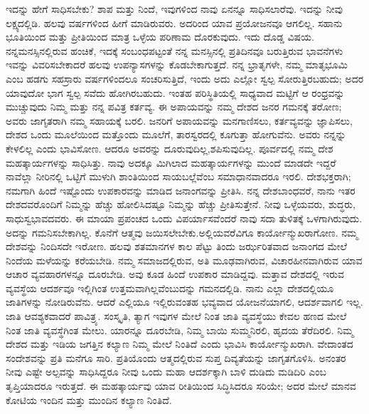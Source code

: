 \vskip 0.2cm

ಇದನ್ನು ಹೇಗೆ ಸಾಧಿಸಬೇಕು? ಶಾಪ ಮತ್ತು ನಿಂದೆ, ಇವುಗಳಿಂದ ನಾವು ಏನನ್ನೂ ಸಾಧಿಸಲಾರೆವು. ಇದನ್ನು ನೀವು ಲಕ್ಷ್ಯದಲ್ಲಿಡಿ. ಹಲವು ವರ್ಷಗಳಿಂದ ಹೀಗೆ ಮಾಡಿರುವರು. ಅದರಿಂದ ಯಾವ ಪ್ರಯೋಜನವೂ ಆಗಲಿಲ್ಲ. ಸಹಾನು ಭೂತಿಯಿಂದ ಮತ್ತು ಪ್ರೀತಿಯಿಂದ ಮಾತ್ರ ಒಳ್ಳೆಯ ಪರಿಣಾಮ ದೊರಕುವುದು. ಇದು ದೊಡ್ಡ ವಿಷಯ. ನನ್ನ\break ಮನಸ್ಸಿನಲ್ಲಿರುವ ಹಂಚಿಕೆ, ಇದಕ್ಕೆ ಸಂಬಂಧಪಟ್ಟಂತೆ ನನ್ನ ಮನಸ್ಸಿನಲ್ಲಿ ಪ್ರತಿದಿನವೂ ಬರು\-ತ್ತಿರುವ ಭಾವನೆಗಳು ಇವನ್ನು ವಿವರಿಸಬೇಕಾದರೆ ಹಲವು ಉಪನ್ಯಾಸಗಳನ್ನು ಕೊಡಬೇಕಾಗುತ್ತದೆ. ನನ್ನ ಭ್ರಾತೃಗಳೇ, ನಮ್ಮ ಮಾತೃಭೂಮಿ ಎಂಬ ಹಡಗು ಸಹಸ್ರಾರು ವರ್ಷಗಳಿಂದಲೂ ಸಂಚರಿಸುತ್ತಿದೆ, ಇಂದು ಅದು ಎಲ್ಲೋ ಸ್ವಲ್ಪ ಸೋರುತ್ತಿರಬಹುದು; ಅದರ ಯಾವುದೋ ಭಾಗ ಸ್ವಲ್ಪ ಸವೆದು ಹೋಗಿರಬಹುದು. ಇಂತಹ ಪರಿಸ್ಥಿತಿಯಲ್ಲಿ ಸಾಧ್ಯವಾದ ಮಟ್ಟಿಗೆ ಆ ರಂಧ್ರವನ್ನು ಮುಚ್ಚುವುದು ನಿಮ್ಮ ಮತ್ತು ನನ್ನ ಪವಿತ್ರ ಕರ್ತವ್ಯ. ಈ ಅಪಾಯವನ್ನು ನಮ್ಮ ದೇಶದ ಜನರ ಗಮನಕ್ಕೆ ತರೋಣ; ಅವರು ಜಾಗೃತರಾಗಿ ನಮ್ಮ ಸಹಾಯಕ್ಕೆ ಬರಲಿ. ಜನರಿಗೆ ಅಪಾಯವನ್ನು ಮನಗಾಣಿಸಲು, ಕರ್ತವ್ಯವನ್ನು ಜ್ಞಾಪಿಸಲು, ದೇಶದ ಒಂದು ಮೂಲೆಯಿಂದ ಮತ್ತೊಂದು ಮೂಲೆಗೆ, ತಾರಸ್ವರದಲ್ಲಿ ಕೂಗುತ್ತಾ ಹೋಗುವೆನು. ಅವರು ನನ್ನನ್ನು ಕೇಳಲಿಲ್ಲ ಎಂದು ಭಾವಿಸೋಣ. ಆದರೂ ಅವರನ್ನು ದೂರುವುದಿಲ್ಲ,\break ಶಪಿಸುವುದಿಲ್ಲ. ಪೂರ್ವದಲ್ಲಿ ನಮ್ಮ ದೇಶ ಮಹತ್ಕಾರ್ಯಗಳನ್ನು ಸಾಧಿಸಿತ್ತು. ನಾವು ಅದಕ್ಕೂ ಮಿಗಿಲಾದ ಮಹತ್ಕಾರ್ಯಗಳನ್ನು ಮುಂದೆ ಮಾಡದೇ ಇದ್ದರೆ ನಾವೆಲ್ಲಾ ನೀರಿನಲ್ಲಿ ಒಟ್ಟಿಗೆ ಮುಳುಗಿ ಶಾಂತಿಯಿಂದ ಸಾಯಬಲ್ಲೆವೆಂಬ ಸಮಾಧಾನವಾದರೂ ಇರಲಿ. ದೇಶಭಕ್ತರಾಗಿ; ನಮಗಾಗಿ ಹಿಂದೆ ಇಷ್ಟೊಂದು ಉಪಕಾರವನ್ನು ಮಾಡಿದ ಜನಾಂಗವನ್ನು ಪ್ರೀತಿಸಿ. ನನ್ನ ದೇಶಬಾಂಧವರೆ, ನಾನು ಇತರ ದೇಶದವರೊಂದಿಗೆ ನಿಮ್ಮನ್ನು ಹೆಚ್ಚು ಹೋಲಿಸಿದಷ್ಟೂ ನಿಮ್ಮನ್ನು ಹೆಚ್ಚು ಪ್ರೀತಿಸುತ್ತೇನೆ. ನೀವು ಒಳ್ಳೆಯವರು, ಶುದ್ಧರು, ಸಾಧುಸ್ವಭಾವದವರು. ಈ ಮಾಯಾ ಪ್ರಪಂಚದ ಒಂದು ವಿಪರ್ಯಾಸವೆಂದರೆ ನಾವು ಸದಾ ತುಳಿತಕ್ಕೆ ಒಳಗಾಗಿರುವುದು. ಅದನ್ನು ಗಮನಿಸಬೇಕಾಗಿಲ್ಲ. ಕೊನೆಗೆ ಆತ್ಮವು ಜಯಿಸಲೇಬೇಕು.\break ಅಲ್ಲಿಯವರೆವಿಗೂ ಕಾರ್ಯೋನ್ಮುಖರಾಗೋಣ. ನಮ್ಮ ದೇಶವನ್ನು ನಿಂದಿಸದೇ ಇರೋಣ. ಹಲವು ಶತಮಾನಗಳ ಕಾಲ ಪೆಟ್ಟು ತಿಂದು ಜರ್ಝರಿತವಾದ ಜನಾಂಗದ ಮೇಲೆ ನಿಂದೆಯ ಮಳೆಯನ್ನು ಕರೆಯಬೇಡಿ. ನಮ್ಮ ಸಮಾಜದಲ್ಲಿರುವ, ಅತಿ ಮೂಢವಾಗಿರುವ, ವಿಚಾರಹೀನವಾಗಿರುವ ಯಾವ ಆಚಾರ ವ್ಯವಹಾರಗಳನ್ನೂ ದೂರಬೇಡಿ. ಅವು ಕೂಡ ಹಿಂದೆ ಉಪಕಾರ ಮಾಡಿದ್ದವು. ಮತ್ತಾವ ದೇಶದಲ್ಲಿ ಇರುವ ವ್ಯವಸ್ಥೆಯ ಆದರ್ಶವೂ ಇಲ್ಲಿಗಿಂತ ಉತ್ತಮವಾಗಿಲ್ಲವೆಂಬುದನ್ನು ಗಮನದಲ್ಲಿಡಿ. ನಾನು ಎಲ್ಲಾ ದೇಶದಲ್ಲಿಯೂ ಜಾತಿಗಳನ್ನು ನೋಡಿರುವೆನು. ಆದರೆ ಎಲ್ಲಿಯೂ ಇಲ್ಲಿರುವಂತಹ ಭವ್ಯವಾದ ಯೋಜನೆಯಾಗಲಿ, ಆದರ್ಶವಾಗಲಿ ಇಲ್ಲ. ಜಾತಿ ಆವಶ್ಯಕವಾದರೆ ಪಾವಿತ್ರ್ಯ. ಸಂಸ್ಕೃತಿ, ತ್ಯಾಗ ಇವುಗಳ ಮೇಲೆ ನಿಂತ ಜಾತಿ ವ್ಯವಸ್ಥೆಯು ಕೇವಲ ಹಣದ ಮೇಲೆ ನಿಂತ ಜಾತಿ ವ್ಯವಸ್ಥೆಗಿಂತ ಮೇಲು. ಯಾರನ್ನೂ ದೂರಬೇಡಿ, ನಿಮ್ಮ ಬಾಯಿ ಸುಮ್ಮನಿರಲಿ, ಹೃದಯ ತೆರೆದಿರಲಿ. ನಿಮ್ಮ ದೇಶದ ಮತ್ತು ಇಡಿಯ ಜಗತ್ತಿನ ಕಲ್ಯಾಣ ನಿಮ್ಮ ಮೇಲೆ ನಿಂತಿದೆ ಎಂದು ಭಾವಿಸಿ ಕಾರ್ಯೋನ್ಮುಖರಾಗಿ. ವೇದಾಂತದ ಸಂದೇಶವನ್ನು ಪ್ರತಿ ಮನೆಗೂ ಸಾರಿ. ಪ್ರತಿಯೊಂದು ಆತ್ಮದಲ್ಲಿರುವ ಸುಪ್ತ ದಿವ್ಯತೆಯನ್ನು ಜಾಗೃತಗೊಳಿಸಿ. ಅನಂತರ ನೀವು ಎಷ್ಟೇ ಅಲ್ಪವನ್ನು ಸಾಧಿಸಿದ್ದರೂ ನೀವು ಒಂದು ಮಹಾ ಆದರ್ಶಕ್ಕಾಗಿ ಬಾಳಿ ದುಡಿದು ಮಡಿದಿರಿ ಎಂಬ ತೃಪ್ತಿಯಾದರೂ ಇರುತ್ತದೆ. ಈ ಮಹತ್ಕಾರ್ಯವು ಯಾವ ರೀತಿಯಿಂದ ಸಿದ್ಧಿಸಿದರೂ ಸರಿಯೇ; ಅದರ ಮೇಲೆ ಮಾನವ ಕೋಟಿಯ ಇಂದಿನ ಮತ್ತು ಮುಂದಿನ ಕಲ್ಯಾಣ ನಿಂತಿದೆ.

